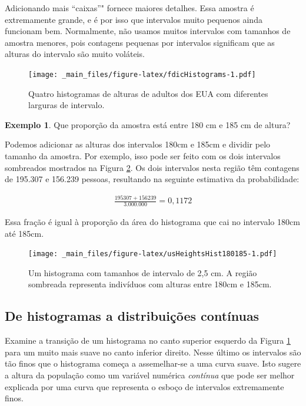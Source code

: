 \documentclass[
]{book}
\theoremstyle{definition}
\theoremstyle{definition}
\newtheorem{example}{Exemplo}[chapter]
\theoremstyle{definition}
\theoremstyle{definition}
\theoremstyle{remark}
\begin{document}
Adicionando mais ``caixas''" fornece maiores detalhes. Essa amostra é extremamente grande, e é por isso que intervalos muito pequenos ainda funcionam bem. Normalmente, não usamos muitos intervalos com tamanhos de amostra menores, pois contagens pequenas por intervalos significam que as alturas do intervalo são muito voláteis.

\begin{figure}
\centering
\texttt{[image: \_main\_files/figure-latex/fdicHistograms-1.pdf]}
\caption{\label{fig:fdicHistograms} Quatro histogramas de alturas de adultos dos EUA com diferentes larguras de intervalo.}
\end{figure}

\begin{example}
\protect\hypertarget{exm:contDistProb}{}{\label{exm:contDistProb} }Que proporção da amostra está entre 180 cm e 185 cm de altura?
\end{example}

Podemos adicionar as alturas dos intervalos 180cm e 185cm e dividir pelo tamanho da amostra. Por exemplo, isso pode ser feito com os dois intervalos sombreados mostrados na Figura \ref{fig:usHeightsHist180185}. Os dois intervalos nesta região têm contagens de 195.307 e 156.239 pessoas, resultando na seguinte estimativa da probabilidade:

\begin{eqnarray*}
\frac{195307+156239}{\text{3.000.000}} = 0,1172
\end{eqnarray*}

Essa fração é igual à proporção da área do histograma que cai no intervalo 180cm até 185cm.

\begin{figure}
\centering
\texttt{[image: \_main\_files/figure-latex/usHeightsHist180185-1.pdf]}
\caption{\label{fig:usHeightsHist180185}Um histograma com tamanhos de intervalo de 2,5 cm. A região sombreada representa indivíduos com alturas entre 180cm e 185cm.}
\end{figure}

\hypertarget{histContinuousDistribution}{%
\subsection{De histogramas a distribuições contínuas}\label{histContinuousDistribution}}

Examine a transição de um histograma no canto superior esquerdo da Figura \ref{fig:fdicHistograms} para um muito mais suave no canto inferior direito. Nesse último os intervalos são tão finos que o histograma começa a assemelhar-se a uma curva suave. Isto sugere a altura da população como um variável numérica \emph{contínua} que pode ser melhor explicada por uma curva que representa o esboço de intervalos extremamente finos.
\end{document}
